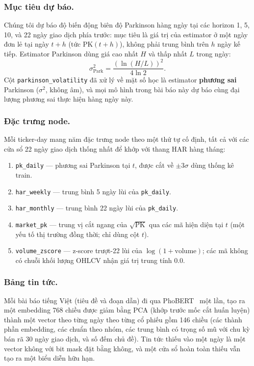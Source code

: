 \documentclass[runningheads]{llncs}
\begin{document}
\subsubsection{Mục tiêu dự báo.}
Chúng tôi dự báo độ biến động biên độ Parkinson hàng ngày tại các horizon 1, 5, 10, và 22 ngày giao dịch
phía trước: mục tiêu là giá trị của estimator ở một ngày đơn lẻ tại ngày $t{+}h$ (tức $\text{PK}(t{+}h)$),
không phải trung bình trên $h$ ngày kế tiếp. Estimator Parkinson dùng giá cao nhất $H$ và thấp nhất $L$
trong ngày:
\begin{equation}
\sigma^2_{\text{Park}} = \frac{\left(\ln(H/L)\right)^2}{4\ln 2}.
\label{eq:parkinson}
\end{equation}
Cột \texttt{parkinson\_volatility} đã xử lý về mặt số học là estimator \textbf{phương sai} Parkinson
($\sigma^2$, không âm), và mọi mô hình trong bài báo này dự báo cùng đại lượng phương sai thực hiện hàng
ngày này.

\subsubsection{Đặc trưng node.}
Mỗi ticker-day mang năm đặc trưng node theo một thứ tự cố định, tất cả với các cửa sổ 22 ngày giao dịch
thống nhất để khớp với thang HAR hàng tháng:
\begin{enumerate}
\item \texttt{pk\_daily} --- phương sai Parkinson tại $t$, được cắt về $\pm 3\sigma$ dùng thống kê train.
\item \texttt{har\_weekly} --- trung bình 5 ngày lùi của \texttt{pk\_daily}.
\item \texttt{har\_monthly} --- trung bình 22 ngày lùi của \texttt{pk\_daily}.
\item \texttt{market\_pk} --- trung vị cắt ngang của $\sqrt{\text{PK}}$ qua các mã hiện diện tại $t$ (một
yếu tố thị trường đồng thời; chỉ dùng cột $t$).
\item \texttt{volume\_zscore} --- z-score trượt-22 lùi của $\log(1+\text{volume})$; các mã không có chuỗi
khối lượng OHLCV nhận giá trị trung tính 0.0.
\end{enumerate}

\subsubsection{Bảng tin tức.}
Mỗi bài báo tiếng Việt (tiêu đề và đoạn dẫn) đi qua PhoBERT~\cite{phobert2020} một lần, tạo ra một
embedding 768 chiều được giảm bằng PCA (khớp trước mốc cắt huấn luyện) thành một vector theo từng ngày
theo từng cổ phiếu gồm 146 chiều (các thành phần embedding, các chuẩn theo nhóm, các trung bình có trọng
số mũ với chu kỳ bán rã 30 ngày giao dịch, và số đếm chủ đề). Tin tức thiếu vào một ngày là một vector
không với bit mask đặt bằng không, và một cửa sổ hoàn toàn thiếu vẫn tạo ra một biểu diễn hữu hạn.
\end{document}
